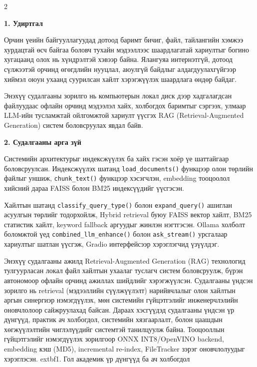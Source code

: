 \documentclass[11pt,a4paper]{article}
\newcommand{\fn}[1]{\nolinkurl{#1}}
\begin{document}
\vspace{1mm}
\setlength{\columnsep}{8mm}
\begin{multicols*}{2}
\setlength{\parskip}{6pt}

\noindent\textbf{1. Удиртгал}

Орчин үеийн байгууллагуудад дотоод баримт бичиг, файл, тайлангийн хэмжээ хурдацтай өсч байгаа боловч тухайн мэдээллээс шаардлагатай хариултыг богино хугацаанд олох нь хүндрэлтэй хэвээр байна. Ялангуяа интернэтгүй, дотоод сүлжээтэй орчинд өгөгдлийн нууцлал, аюулгүй байдлыг алдагдуулахгүйгээр хиймэл оюун ухаанд суурилсан хайлт хэрэгжүүлэх шаардлага өндөр байдаг.

Энэхүү судалгааны зорилго нь компьютерын локал диск дээр хадгалагдсан файлуудаас офлайн орчинд мэдээлэл хайх, холбогдох баримтыг сэргээх, улмаар LLM-ийн тусламжтай ойлгомжтой хариулт үүсгэх RAG (Retrieval-Augmented Generation) систем боловсруулах явдал байв.

\noindent\textbf{2. Судалгааны арга зүй}

Системийн архитектурыг индексжүүлэх ба хайх гэсэн хоёр үе шаттайгаар боловсруулсан. Индексжүүлэх шатанд \fn{load_documents()} функцээр олон төрлийн файлыг уншиж, \fn{chunk_text()} функцээр хэсэгчлэн, embedding тооцоолол хийсний дараа FAISS болон BM25 индексүүдийг үүсгэсэн.

Хайлтын шатанд \fn{classify_query_type()} болон \fn{expand_query()} ашиглан асуулгын төрлийг тодорхойлж, Hybrid retrieval буюу FAISS вектор хайлт, BM25 статистик хайлт, keyword fallback аргуудыг жинлэн нэгтгэсэн. Ollama холболт боломжтой үед \fn{combined_llm_enhance()} болон \fn{ask_stream()} урсгалаар хариултыг шатлан үүсгэж, Gradio интерфейсээр хэрэглэгчид үзүүлдэг.

Энэхүү судалгааны ажилд Retrieval-Augmented Generation (RAG) технологид тулгуурласан локал файл хайлтын ухаалаг туслагч систем боловсруулж, бүрэн автономоор офлайн орчинд ажиллах шийдлийг хэрэгжүүлсэн. Судалгааны үндсэн зорилго нь retrieval (мэдээллийн сүүлжүүлэлт) нарийвчлалыг олон хайлтын аргын синергиэр нэмэгдүүлэх, мөн системийн гүйцэтгэлийг инженерчлэлийн оновчлолоор сайжруулахад байсан. Дараах хэсгүүдэд судалгааны үндсэн үр дүнгүүд, практик ач холбогдол, системийн хязгаарлалт, болон цаашдын хөгжүүлэлтийн чиглэлүүдийг системтэй танилцуулж байна.
Тооцооллын гүйцэтгэлийг нэмэгдүүлэх зорилгоор ONNX INT8/OpenVINO backend, embedding кэш (MD5), incremental re-index, FileTracker зэрэг оновчлолуудыг хэрэглэсэн.
      extbf{1. Гол академик үр дүнгүүд ба ач холбогдол}


\end{multicols*}
\end{document}
